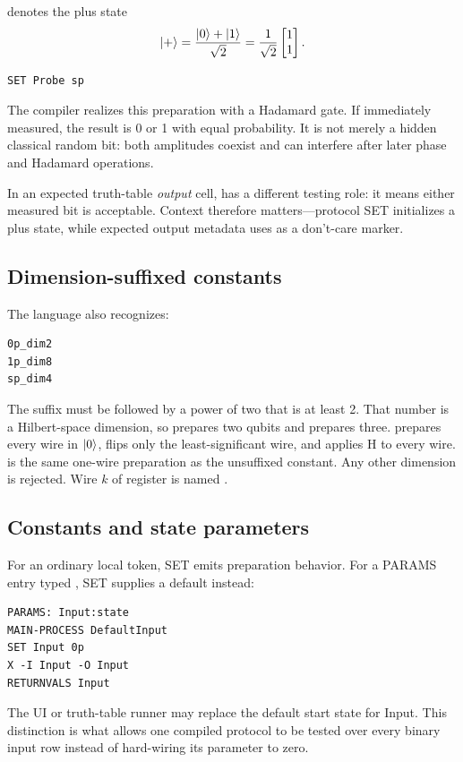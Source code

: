  denotes the plus state
\[
\lvert +\rangle=\frac{\lvert 0\rangle+\lvert 1\rangle}{\sqrt2}
=\frac1{\sqrt2}\begin{bmatrix}1\\1\end{bmatrix}.
\]
\begin{lstlisting}
SET Probe sp
\end{lstlisting}
The compiler realizes this preparation with a Hadamard gate. If immediately
measured, the result is 0 or 1 with equal probability. It is not merely a hidden
classical random bit: both amplitudes coexist and can interfere after later
phase and Hadamard operations.

In an expected truth-table \emph{output} cell,  has a different
testing role: it means either measured bit is acceptable. Context therefore
matters---protocol SET initializes a plus state, while expected output metadata
uses  as a don't-care marker.

\subsection{Dimension-suffixed constants}

The language also recognizes:
\begin{lstlisting}
0p_dim2
1p_dim8
sp_dim4
\end{lstlisting}
The suffix must be  followed by a power of two that is at least 2.
That number is a Hilbert-space dimension, so  prepares two qubits
and  prepares three.  prepares every wire in $\lvert 0\rangle$,
 flips only the least-significant wire, and  applies H to
every wire.  is the same one-wire preparation as the unsuffixed
constant. Any other dimension is rejected. Wire $k$ of register  is
named .

\subsection{Constants and state parameters}

For an ordinary local token, SET emits preparation behavior. For a PARAMS entry
typed , SET supplies a default instead:
\begin{lstlisting}
PARAMS: Input:state
MAIN-PROCESS DefaultInput
SET Input 0p
X -I Input -O Input
RETURNVALS Input
\end{lstlisting}
The UI or truth-table runner may replace the default start state for Input.
This distinction is what allows one compiled protocol to be tested over every
binary input row instead of hard-wiring its parameter to zero.


